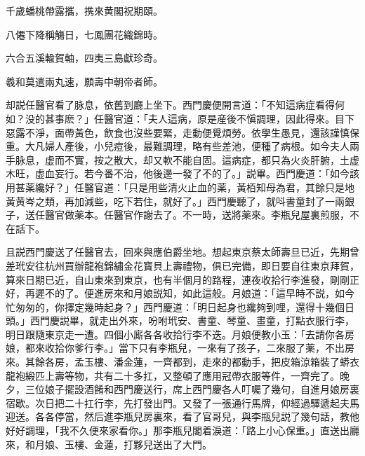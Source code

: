 千歲蟠桃帶露攜，携來黄閣祝期頤。

八僊下降稱觴日，七鳳團花織錦時。

六合五溪輸賀軸，四夷三島獻珍奇。

羲和莫遣兩丸速，願壽中朝帝者師。

却説任醫官看了脉息，依舊到廳上坐下。西門慶便開言道：「不知這病症看得何如？没的甚事麽？」任醫官道：「夫人這病，原是産後不愼調理，因此得來。目下惡露不淨，面帶黃色，飲食也沒些要緊，走動便覺煩勞。依學生愚見，還該謹慎保重。大凡婦人產後，小兒痘後，最難調理，略有些差池，便種了病根。如今夫人兩手脉息，虚而不實，按之散大，却又軟不能自固。這病症，都只為火炎肝腑，土虚木旺，虚血妄行。若今番不治，他後邊一發了不的了。」説畢。西門慶道：「如今該用甚薬纔好？」任醫官道：「只是用些清火止血的薬，黃栢知母為君，其餘只是地黃黄岑之類，再加減些，吃下若住，就好了。」西門慶聽了，就呌書童封了一兩銀子，送任醫官做薬本。任醫官作謝去了。不一時，送將薬來。李瓶兒屋裏煎服，不在話下。

且説西門慶送了任醫官去，回來與應伯爵坐地。想起東京蔡太師壽旦已近，先期曾差玳安往杭州買辦龍袍錦繡金花寳貝上壽禮物，俱已完備，即日要自往東京拜賀，算來日期已近，自山東來到東京，也有半個月的路程，連夜收拾行李進發，剛剛正好，再遲不的了。便進房來和月娘説知，如此這般。月娘道：「這早時不説，如今忙匆匆的，你擇定幾時起身？」西門慶道：「明日起身也纔夠到哩，還得十幾個日頭。」西門慶説畢，就走出外來，吩咐玳安、書童、琴童、畫童，打點衣服行李，明日跟隨東京走一遭。四個小廝各各收拾行李不迭。月娘便教小玉：「去請你各房娘，都來收拾你爹行李。」當下只有李瓶兒，一來有了孩子，二來服了薬，不出房來。其餘各房，孟玉樓、潘金蓮，一齊都到，走來的都動手，把皮箱涼箱裝了蟒衣龍袍緞匹上壽等物，共有二十多扛，又整頓了應用冠帶衣服等件，一齊完了。晚夕，三位娘子擺設酒餚和西門慶送行，席上西門慶各人叮囑了幾句，自進月娘房裏宿歇。次日把二十扛行李，先打發出門。又發了一張通行馬牌，仰經過驛遞起夫馬迎送。各各停當，然后進李瓶兒房裏來，看了官哥兒，與李瓶兒説了幾句話，教他好好調理，「我不久便來家看你。」那李瓶兒閣着淚道：「路上小心保重。」直送出廳來，和月娘、玉樓、金蓮，打夥兒送出了大門。

